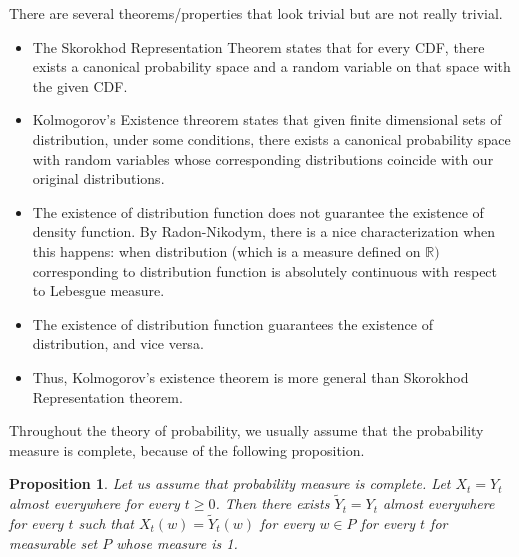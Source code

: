\documentclass{article}
\newtheorem{proposition}[theorem]{Proposition}
\theoremstyle{remark}
\begin{document}
There are several theorems/properties that look trivial but are not really trivial.
\begin{itemize}
\item The Skorokhod Representation Theorem 
    states that for every CDF, there exists a canonical probability space and a random variable on that space with the given CDF.
\item Kolmogorov's Existence threorem states that given finite dimensional sets of distribution, under some conditions, there exists a canonical probability space with random variables whose 
corresponding distributions coincide with our original distributions.
\item The existence of distribution function does not guarantee the existence of density function. By Radon-Nikodym, there is a nice characterization when this happens: when distribution (which is a measure defined on $\mathbb{R})$ corresponding to distribution function is absolutely continuous with respect to
 Lebesgue measure.
\item The existence of distribution function guarantees the existence of distribution, and vice versa.
\item Thus, Kolmogorov's existence theorem is more general than Skorokhod Representation theorem.
\end{itemize}
Throughout the theory of probability, we usually assume that the probability measure is complete, because of the following proposition.
\begin{proposition}
    Let us assume that probability measure is complete. Let $X_t=Y_t$ almost everywhere for every $t\geq 0$.
    Then there exists $\tilde{Y}_t=Y_t$ almost everywhere for every $t$ such that $X_t(w)=\tilde{Y}_t(w)$ for every $w\in P$ for every $t$ for 
    measurable set $P$ whose measure is 1.
\end{proposition}
\end{document}
